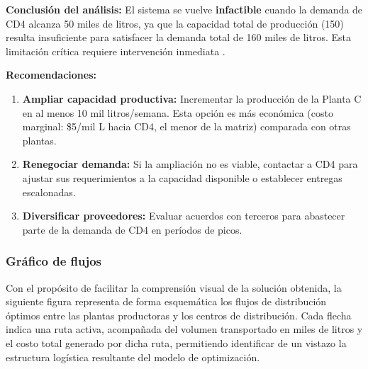 \documentclass[12pt,a4paper]{article}
\begin{document}
\noindent\textbf{Conclusi\'{o}n del an\'{a}lisis:}
El sistema se vuelve \textbf{infactible} cuando la demanda de CD4 alcanza 50 miles de litros,
ya que la capacidad total de producci\'{o}n (150) resulta insuficiente para satisfacer la demanda
total de 160 miles de litros. Esta limitaci\'{o}n cr\'{i}tica requiere intervenci\'{o}n inmediata \cite{taha2012}.

\noindent\textbf{Recomendaciones:}
\begin{enumerate}
  \item \textbf{Ampliar capacidad productiva:} Incrementar la producci\'{o}n de la Planta C en
  al menos 10 mil litros/semana. Esta opci\'{o}n es m\'{a}s econ\'{o}mica (costo marginal: \$5/mil L
  hacia CD4, el menor de la matriz) comparada con otras plantas.
  
  \item \textbf{Renegociar demanda:} Si la ampliaci\'{o}n no es viable, contactar a CD4 para
  ajustar sus requerimientos a la capacidad disponible o establecer entregas escalonadas.
  
  \item \textbf{Diversificar proveedores:} Evaluar acuerdos con terceros para abastecer parte
  de la demanda de CD4 en per\'{i}odos de picos.
\end{enumerate}

\subsubsection{Gr\'{a}fico de flujos}

Con el prop\'{o}sito de facilitar la comprensi\'{o}n visual de la soluci\'{o}n obtenida, 
la siguiente figura representa de forma esquem\'{a}tica los flujos de distribuci\'{o}n 
\'{o}ptimos entre las plantas productoras y los centros de distribuci\'{o}n. 
Cada flecha indica una ruta activa, acompa\~{n}ada del volumen transportado en miles 
de litros y el costo total generado por dicha ruta, permitiendo identificar de un vistazo 
la estructura log\'{i}stica resultante del modelo de optimizaci\'{o}n.
\end{document}
